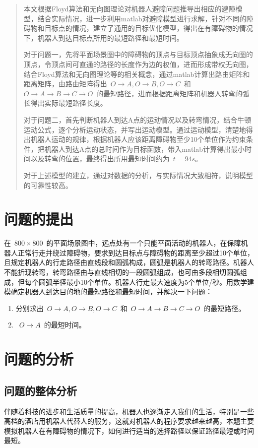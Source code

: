 \documentclass{JXUSTmodeling}
\begin{document}
\begin{abstract}
本文根据Floyd算法和无向图理论对机器人避障问题推导出相应的避障模型，结合实际情况，进一步利用matlab对避障模型进行求解，针对不同的障碍物和目标点的情况，建立了通用的目标优化模型，得出在有障碍物的情况下，机器人到达目标点所用的最短路径和最短时间。\par
对于问题一，先将平面场景图中的障碍物的顶点与目标顶点抽象成无向图的顶点，令顶点间可直通的路径的长度作为边的权值，进而形成带权无向图，结合Floyd算法和无向图理论等的相关概念，通过matlab计算出路由矩阵和距离矩阵，由路由矩阵得出~$O\to A,O\to B,O\to C$~和~$O\to A\to B\to C\to O$~的最短路径，进而根据距离矩阵和机器人转弯的弧长得出实际最短路径长度。\par
对于问题二，首先判断机器人到达A点的运动情况以及转弯情况，结合牛顿运动公式，逐个分析运动状态，并写出运动模型。通过运动模型，清楚地得出机器人运动的规律，根据机器人应该距离障碍物至少10个单位作为约束条件，把机器人到达A点的总时间作为目标函数，带入matlab计算得出最小时间以及转弯的位置，最终得出所用最短时间约为~$t=94s$。\par
对于上述模型的建立，通过对数据的分析，与实际情况大致相符，说明模型的可靠性较高。
\end{abstract}
\section{问题的提出}\label{sec:1}

在~$800\times 800$~的平面场景图中，远点处有一个只能平面活动的机器人，在保障机器人正常行走并绕过障碍物，要求到达目标点与障碍物的距离至少超过10个单位，且规定机器人的行走路径由直线段和圆弧构成，圆弧是机器人的转弯路径。机器人不能折现转弯，转弯路径由与直线相切的一段圆弧组成，也可由多段相切圆弧组成，但每个圆弧半径最小10个单位。机器人行走最大速度为5个单位/秒。用数学建模确定机器人到达目的地的最短路径和最短时间，并解决一下问题：
\begin{enumerate}
\item 分别求出~$O\to A,O\to B,O\to C$~和~$O\to A\to B\to C\to O$~的最短路径。
\item ~$O\to A$~的最短时间。
\end{enumerate}

\section{问题的分析}\label{sec:2}
\subsection{问题的整体分析}\label{sub:2.1}
伴随着科技的进步和生活质量的提高，机器人也逐渐走入我们的生活，特别是一些高档的酒店用机器人代替人的服务，这就对机器人的程序要求越来越高，本题主要模拟机器人在有障碍物的情况下，如何进行适当的选择路径以保证路径最短或时间最短。
\end{document}
